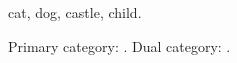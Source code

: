 \documentclass{article}
\begin{document}
\gls{cat}, \gls{dog}, \gls{castle}, \gls{child}.


Primary category: .
Dual category: .

\printunsrtglossaries
\end{document}

